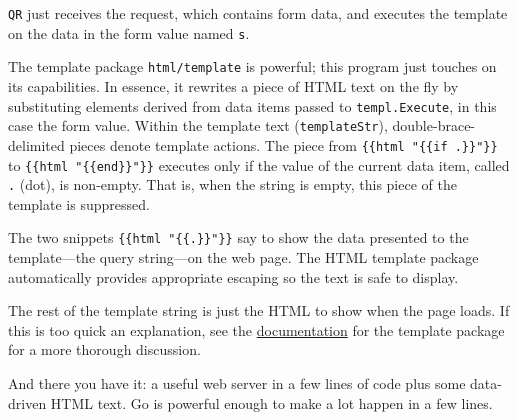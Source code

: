 \texttt{QR} just receives the request, which contains form data, and
executes the template on the data in the form value named \texttt{s}.

The template package \texttt{html/template} is powerful; this program
just touches on its capabilities. In essence, it rewrites a piece of
HTML text on the fly by substituting elements derived from data items
passed to \texttt{templ.Execute}, in this case the form value. Within
the template text (\texttt{templateStr}), double-brace-delimited pieces
denote template actions. The piece from
\texttt{\{\{html "\{\{if .\}\}"\}\}} to
\texttt{\{\{html "\{\{end\}\}"\}\}} executes only if the value of the
current data item, called \texttt{.} (dot), is non-empty. That is, when
the string is empty, this piece of the template is suppressed.

The two snippets \texttt{\{\{html "\{\{.\}\}"\}\}} say to show the data
presented to the template---the query string---on the web page. The HTML
template package automatically provides appropriate escaping so the text
is safe to display.

The rest of the template string is just the HTML to show when the page
loads. If this is too quick an explanation, see the
\href{/pkg/html/template/}{documentation} for the template package for a
more thorough discussion.

And there you have it: a useful web server in a few lines of code plus
some data-driven HTML text. Go is powerful enough to make a lot happen
in a few lines.

